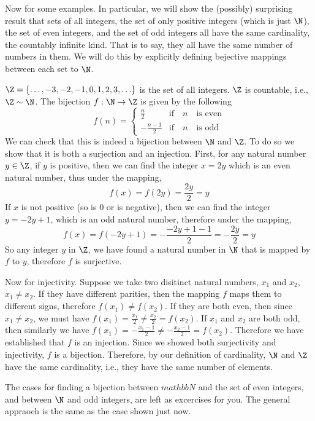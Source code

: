 \documentclass[../../templates/section]{subfiles}
\begin{document}
Now for some examples. In particular, we will show the (possibly) surprising
result that sets of all integers, the set of only positive integers (which is
just $\N$), the set of even integers, and the set of odd integers all have the
same cardinality, the countably infinite kind.  That is to say, they all have
the same number of numbers in them.  We will do this by explicitly defining
bejective mappings between each set to $\N$.

\begin{example}
$\Z = \{\ldots, -3, -2, -1, 0, 1, 2, 3, \ldots\}$ is the set of all integers.
$\Z$ is countable, i.e., $\Z \sim \N$. The bijection $f:\N \to \Z$ is
given by the following
\[ 
f(n) =
\begin{cases} 
    \frac{n}{2}      & \text{if} \quad n \quad \text{is even} \\
    -\frac{n - 1}{2} & \text{if} \quad n \quad \text{is odd}
\end{cases}
\]
We can check that this is indeed a bijection between $\N$ and $\Z$.  To do so
we show that it is both a surjection and an injection. First, for any natural
number $y\in \Z$, if $y$ is positive, then we can find the integer $x = 2y$
which is an even natural number, thus under the mapping,
\[
f(x) = f(2y) = \frac{2y}{2} = y
\]
If $x$ is not positive (so is 0 or is negative), then we can find the integer
$y = -2y + 1$, which is an odd natural number, therefore under the mapping,
\[
f(x) = f(-2y + 1) = -\frac{-2y + 1 - 1}{2} = -\frac{2y}{2} = y
\]
So any integer $y$ in $\Z$, we have found a natural number in $\N$ that is
mapped by $f$ to $y$, therefore $f$ is surjective.

Now for injectivity. Suppose we take two disitinct natural numbers, $x_1$ and
$x_2$, $x_1\neq x_2$. If they have different parities, then the mapping $f$
maps them to different signs, therefore $f(x_1)\neq f(x_2)$. If they are both
even, then since $x_1\neq x_2$, we must have $f(x_1) = \frac{x_1}{2}\neq
\frac{x_2}{2} = f(x_2)$. If $x_1$ and $x_2$ are both odd, then similarly we
have $f(x_1) = -\frac{x_1-1}{2}\neq -\frac{x_2-1}{2} = f(x_2)$. Therefore we
have established that $f$ is an injection. Since we showed both surjectivity
and injectivity, $f$ is a bijection. Therefore, by our definition of
cardinality, $\N$ and $\Z$ have the same cardinality, i.e., they have the same
number of elements.

The cases for finding a bijection between $mathbb{N}$ and the set of even
integers, and between $\N$ and odd integers, are left as excercises for you.
The general appraoch is the same as the case shown just now.
\end{example} 
\end{document}
